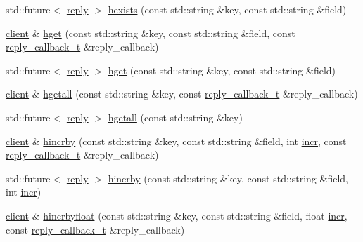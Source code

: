 \begin{DoxyCompactItemize}
\item 
std\+::future$<$ \hyperlink{classcpp__redis_1_1reply}{reply} $>$ \hyperlink{classcpp__redis_1_1client_a1fede52ba18414d75f37e776cc62b7f8}{hexists} (const std\+::string \&key, const std\+::string \&field)
\item 
\hyperlink{classcpp__redis_1_1client}{client} \& \hyperlink{classcpp__redis_1_1client_ac1db14da1ab3d1353ce35a1c923979e3}{hget} (const std\+::string \&key, const std\+::string \&field, const \hyperlink{classcpp__redis_1_1client_a061a1140d36d2eaeda82b09a0bb3f9f2}{reply\+\_\+callback\+\_\+t} \&reply\+\_\+callback)
\item 
std\+::future$<$ \hyperlink{classcpp__redis_1_1reply}{reply} $>$ \hyperlink{classcpp__redis_1_1client_aa84b4c8e9391f5ed37d4c9ef977e2c85}{hget} (const std\+::string \&key, const std\+::string \&field)
\item 
\hyperlink{classcpp__redis_1_1client}{client} \& \hyperlink{classcpp__redis_1_1client_a8bd82cb86dad87a944c039a57bf67968}{hgetall} (const std\+::string \&key, const \hyperlink{classcpp__redis_1_1client_a061a1140d36d2eaeda82b09a0bb3f9f2}{reply\+\_\+callback\+\_\+t} \&reply\+\_\+callback)
\item 
std\+::future$<$ \hyperlink{classcpp__redis_1_1reply}{reply} $>$ \hyperlink{classcpp__redis_1_1client_a44321960e02c6ee6b6b36ffc960e4257}{hgetall} (const std\+::string \&key)
\item 
\hyperlink{classcpp__redis_1_1client}{client} \& \hyperlink{classcpp__redis_1_1client_a517b6bdeb07edf20f5e57eb1b4942dd5}{hincrby} (const std\+::string \&key, const std\+::string \&field, int \hyperlink{classcpp__redis_1_1client_a2f9ba6c7e83451207403096b19da4faa}{incr}, const \hyperlink{classcpp__redis_1_1client_a061a1140d36d2eaeda82b09a0bb3f9f2}{reply\+\_\+callback\+\_\+t} \&reply\+\_\+callback)
\item 
std\+::future$<$ \hyperlink{classcpp__redis_1_1reply}{reply} $>$ \hyperlink{classcpp__redis_1_1client_aee1f9d8b1fe77bc5bed18000a9cf8b6f}{hincrby} (const std\+::string \&key, const std\+::string \&field, int \hyperlink{classcpp__redis_1_1client_a2f9ba6c7e83451207403096b19da4faa}{incr})
\item 
\hyperlink{classcpp__redis_1_1client}{client} \& \hyperlink{classcpp__redis_1_1client_ade2a386b51e8bbd59cd7feef51bd0637}{hincrbyfloat} (const std\+::string \&key, const std\+::string \&field, float \hyperlink{classcpp__redis_1_1client_a2f9ba6c7e83451207403096b19da4faa}{incr}, const \hyperlink{classcpp__redis_1_1client_a061a1140d36d2eaeda82b09a0bb3f9f2}{reply\+\_\+callback\+\_\+t} \&reply\+\_\+callback)

\end{DoxyCompactItemize}
